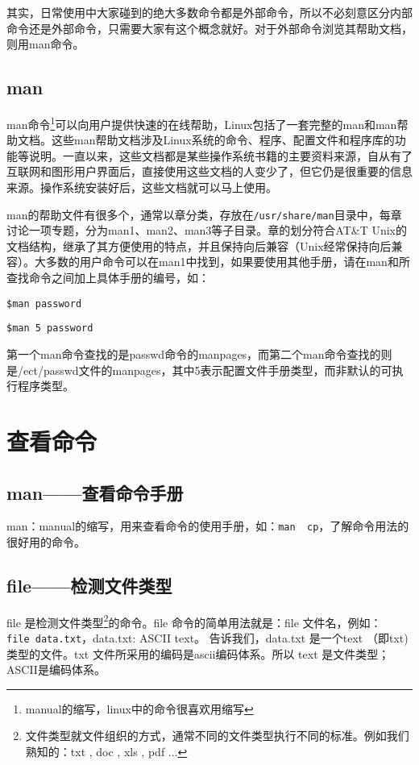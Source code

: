 其实，日常使用中大家碰到的绝大多数命令都是外部命令，所以不必刻意区分内部命令还是外部命令，只需要大家有这个概念就好。对于外部命令浏览其帮助文档，则用man命令。


\subsection{man}
man命令\footnote{manual的缩写，linux中的命令很喜欢用缩写}可以向用户提供快速的在线帮助，Linux包括了一套完整的man和man帮助文档。这些man帮助文档涉及Linux系统的命令、程序、配置文件和程序库的功能等说明。一直以来，这些文档都是某些操作系统书籍的主要资料来源，自从有了互联网和图形用户界面后，直接使用这些文档的人变少了，但它仍是很重要的信息来源。操作系统安装好后，这些文档就可以马上使用。

man的帮助文件有很多个，通常以章分类，存放在\verb|/usr/share/man|目录中，每章讨论一项专题，分为man1、man2、man3等子目录。章的划分符合AT\&T Unix的文档结构，继承了其方便使用的特点，并且保持向后兼容（Unix经常保持向后兼容）。大多数的用户命令可以在man1中找到，如果要使用其他手册，请在man和所查找命令之间加上具体手册的编号，如：

\verb*|$man password|

\verb*|$man 5 password|

第一个man命令查找的是passwd命令的manpages，而第二个man命令查找的则是/ect/passwd文件的manpages，其中5表示配置文件手册类型，而非默认的可执行程序类型。


\section{查看命令}
\subsection{man——查看命令手册}
man：manual的缩写，用来查看命令的使用手册，如：\verb*|man  cp|，了解命令用法的很好用的命令。


\subsection{file——检测文件类型}
 file 是检测文件类型\footnote{文件类型就文件组织的方式，通常不同的文件类型执行不同的标准。例如我们熟知的：txt , doc , xls , pdf ...}的命令。file 命令的简单用法就是：file 文件名，例如：\\
\verb*|file data.txt|，data.txt: ASCII text。
告诉我们，data.txt 是一个text （即txt) 类型的文件。txt 文件所采用的编码是ascii编码体系。所以 text 是文件类型；ASCII是编码体系。


